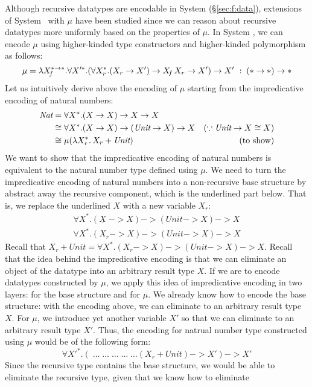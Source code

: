 Although recursive datatypes are encodable in System \F (\S\ref{sec:f:data}),
extensions of System \F\ with $\mu$ have been studied %
since we can reason about recursive datatypes more uniformly based on
the properties of $\mu$. In System \Fw, we can encode $\mu$ using
higher-kinded type constructors and higher-kinded polymorphism as follows:
\[
\mu =
 \lambda X_{\!f}^{* -> *}.
 \forall X'^{*}.(\forall X_r^{*}.(X_r -> X') -> X_{\!f}\,X_r -> X') -> X'
 ~:\; (* -> *) -> *
\]
Let us intuitively derive above the encoding of $\mu$ starting from
the impredicative encoding of natural numbers:
\begin{align*}
\textit{Nat}
        &= \forall X^{*} . (X -> X) -> X -> X \\
        &\cong \forall X^{*} . (X -> X) -> (\textit{Unit} -> X) -> X 
                &(\because \textit{Unit} -> X \cong X) \\
        &\cong \mu(\lambda X_r^{*}.\,X_r + \textit{Unit})
                & (\text{to show})
\end{align*}
We want to show that the impredicative encoding of natural numbers is
equivalent to the natural number type defined using $\mu$. We need to turn
the impredicative encoding of natural numbers into a non-recursive
base structure by abstract away the recursive component, which is
the underlined part below. That is, we replace the underlined $X$
with a new variable $X_r$:
\begin{align*}
\forall X^{*} . (\underline{X}\; -> X) -> (\textit{Unit} -> X) -> X \\
\forall X^{*} . (X_r -> X) -> (\textit{Unit} -> X) -> X
\end{align*}
Recall that
$X_r +\textit{Unit} = \forall X^{*} . (X_r -> X) -> (\textit{Unit} -> X) -> X$.
Recall that the idea behind the impredicative encoding is that we can eliminate
an object of the datatype into an arbitrary result type $X$. If we are to
encode datatypes constructed by $\mu$, we apply this idea of
impredicative encoding in two layers: for the base structure and for $\mu$.
We already know how to encode the base structure: with the encoding above,
we can eliminate to an arbitrary result type $X$. For $\mu$, we introduce
yet another variable $X'$ so that we can eliminate to an arbitrary result
type $X'$. Thus, the encoding for natrual number type constructed using $\mu$
would be of the following form:
\[ \forall X'^{*}.(\;\dots\;\dots\;\dots\;\dots\;\dots (X_r + \textit{Unit}) -> X') -> X' \]
Since the recursive type contains the base structure, we would be able to
eliminate the recursive type, given that we know how to eliminate

